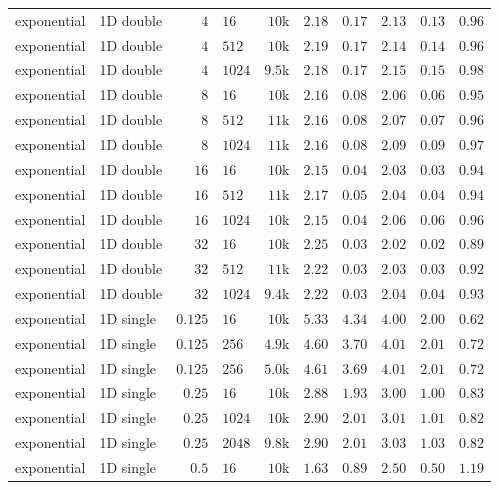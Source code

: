 {\begin{longtable}{llrlrrrrrr}
    exponential & 1D double & $4$ & $16$ & $10$k & $2.18$ & $0.17$ & $2.13$ & $0.13$ & $0.96$ \\
    exponential & 1D double & $4$ & $512$ & $10$k & $2.19$ & $0.17$ & $2.14$ & $0.14$ & $0.96$ \\
    exponential & 1D double & $4$ & $1024$ & $9.5$k & $2.18$ & $0.17$ & $2.15$ & $0.15$ & $0.98$ \\
    exponential & 1D double & $8$ & $16$ & $10$k & $2.16$ & $0.08$ & $2.06$ & $0.06$ & $0.95$ \\
    exponential & 1D double & $8$ & $512$ & $11$k & $2.16$ & $0.08$ & $2.07$ & $0.07$ & $0.96$ \\
    exponential & 1D double & $8$ & $1024$ & $11$k & $2.16$ & $0.08$ & $2.09$ & $0.09$ & $0.97$ \\
    exponential & 1D double & $16$ & $16$ & $10$k & $2.15$ & $0.04$ & $2.03$ & $0.03$ & $0.94$ \\
    exponential & 1D double & $16$ & $512$ & $11$k & $2.17$ & $0.05$ & $2.04$ & $0.04$ & $0.94$ \\
    exponential & 1D double & $16$ & $1024$ & $10$k & $2.15$ & $0.04$ & $2.06$ & $0.06$ & $0.96$ \\
    exponential & 1D double & $32$ & $16$ & $10$k & $2.25$ & $0.03$ & $2.02$ & $0.02$ & $0.89$ \\
    exponential & 1D double & $32$ & $512$ & $11$k & $2.22$ & $0.03$ & $2.03$ & $0.03$ & $0.92$ \\
    exponential & 1D double & $32$ & $1024$ & $9.4$k & $2.22$ & $0.03$ & $2.04$ & $0.04$ & $0.93$ \\
    \midrule
    exponential & 1D single & $0.125$ & $16$ & $10$k & $5.33$ & $4.34$ & $4.00$ & $2.00$ & $0.62$ \\
    exponential & 1D single & $0.125$ & $256$ & $4.9$k & $4.60$ & $3.70$ & $4.01$ & $2.01$ & $0.72$ \\
    exponential & 1D single & $0.125$ & $256$ & $5.0$k & $4.61$ & $3.69$ & $4.01$ & $2.01$ & $0.72$ \\
    exponential & 1D single & $0.25$ & $16$ & $10$k & $2.88$ & $1.93$ & $3.00$ & $1.00$ & $0.83$ \\
    exponential & 1D single & $0.25$ & $1024$ & $10$k & $2.90$ & $2.01$ & $3.01$ & $1.01$ & $0.82$ \\
    exponential & 1D single & $0.25$ & $2048$ & $9.8$k & $2.90$ & $2.01$ & $3.03$ & $1.03$ & $0.82$ \\
    exponential & 1D single & $0.5$ & $16$ & $10$k & $1.63$ & $0.89$ & $2.50$ & $0.50$ & $1.19$ \\

\end{longtable}}
